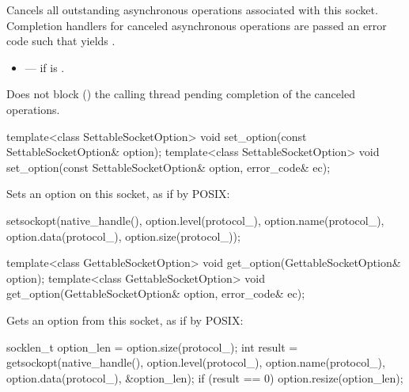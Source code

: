 \begin{itemdescr}
\pnum
\effects Cancels all outstanding asynchronous operations associated with this socket. Completion handlers for canceled asynchronous operations are passed an error code  such that  yields .

\pnum
\errors
\begin{itemize}
\item
{} --- if  is .
\end{itemize}

\pnum
\remarks Does not block () the calling thread pending completion of the canceled operations.
\end{itemdescr}

\begin{itemdecl}
template<class SettableSocketOption>
  void set_option(const SettableSocketOption& option);
template<class SettableSocketOption>
  void set_option(const SettableSocketOption& option, error_code& ec);
\end{itemdecl}

\begin{itemdescr}
\pnum
\effects Sets an option on this socket, as if by POSIX:
\begin{codeblock}
setsockopt(native_handle(), option.level(protocol_), option.name(protocol_),
           option.data(protocol_), option.size(protocol_));
\end{codeblock}
\end{itemdescr}

\begin{itemdecl}
template<class GettableSocketOption>
  void get_option(GettableSocketOption& option);
template<class GettableSocketOption>
  void get_option(GettableSocketOption& option, error_code& ec);
\end{itemdecl}

\begin{itemdescr}
\pnum
\effects Gets an option from this socket, as if by POSIX:
\begin{codeblock}
socklen_t option_len = option.size(protocol_);
int result = getsockopt(native_handle(), option.level(protocol_),
                        option.name(protocol_), option.data(protocol_),
                        &option_len);
if (result == 0)
  option.resize(option_len);
\end{codeblock}

\end{itemdescr}

